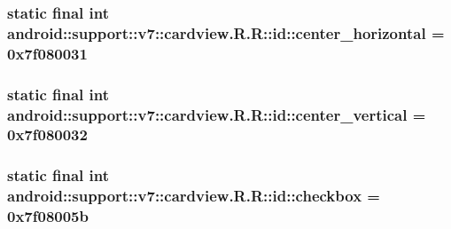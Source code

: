 \hypertarget{classandroid_1_1support_1_1v7_1_1cardview_1_1_r_1_1id_39e4be1ebc792dd3144dc56d5b2f2f6f}{
\subsubsection[{center\_\-horizontal}]{\setlength{\rightskip}{0pt plus 5cm}static final int android::support::v7::cardview.R.R::id::center\_\-horizontal = 0x7f080031}}
\label{classandroid_1_1support_1_1v7_1_1cardview_1_1_r_1_1id_39e4be1ebc792dd3144dc56d5b2f2f6f}


\hypertarget{classandroid_1_1support_1_1v7_1_1cardview_1_1_r_1_1id_26b30646b84bc36bfa8e21e2ce9cf44b}{
\subsubsection[{center\_\-vertical}]{\setlength{\rightskip}{0pt plus 5cm}static final int android::support::v7::cardview.R.R::id::center\_\-vertical = 0x7f080032}}
\label{classandroid_1_1support_1_1v7_1_1cardview_1_1_r_1_1id_26b30646b84bc36bfa8e21e2ce9cf44b}


\hypertarget{classandroid_1_1support_1_1v7_1_1cardview_1_1_r_1_1id_762851b17507e92559b390eb4c6c9f15}{
\subsubsection[{checkbox}]{\setlength{\rightskip}{0pt plus 5cm}static final int android::support::v7::cardview.R.R::id::checkbox = 0x7f08005b}}
\label{classandroid_1_1support_1_1v7_1_1cardview_1_1_r_1_1id_762851b17507e92559b390eb4c6c9f15}


